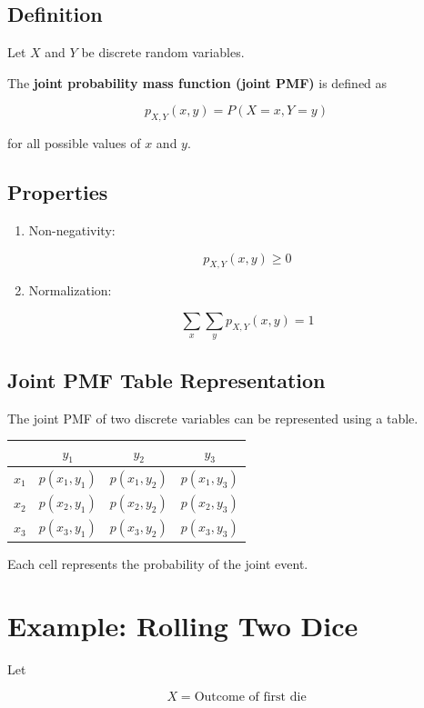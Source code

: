\documentclass[11pt]{article}
\begin{document}
\subsection{Definition}

Let \(X\) and \(Y\) be discrete random variables.

The \textbf{joint probability mass function (joint PMF)} is defined as

\[
p_{X,Y}(x,y) = P(X = x, Y = y)
\]

for all possible values of \(x\) and \(y\).

\subsection{Properties}

\begin{enumerate}
\item Non-negativity:

\[
p_{X,Y}(x,y) \ge 0
\]

\item Normalization:

\[
\sum_x \sum_y p_{X,Y}(x,y) = 1
\]
\end{enumerate}

\subsection{Joint PMF Table Representation}

The joint PMF of two discrete variables can be represented using a table.

\begin{center}
\begin{tabular}{c|ccc}
 & $y_1$ & $y_2$ & $y_3$ \\
\hline
$x_1$ & $p(x_1,y_1)$ & $p(x_1,y_2)$ & $p(x_1,y_3)$ \\
$x_2$ & $p(x_2,y_1)$ & $p(x_2,y_2)$ & $p(x_2,y_3)$ \\
$x_3$ & $p(x_3,y_1)$ & $p(x_3,y_2)$ & $p(x_3,y_3)$
\end{tabular}
\end{center}

Each cell represents the probability of the joint event.

\section{Example: Rolling Two Dice}

Let

\[
X = \text{Outcome of first die}
\]
\end{document}
